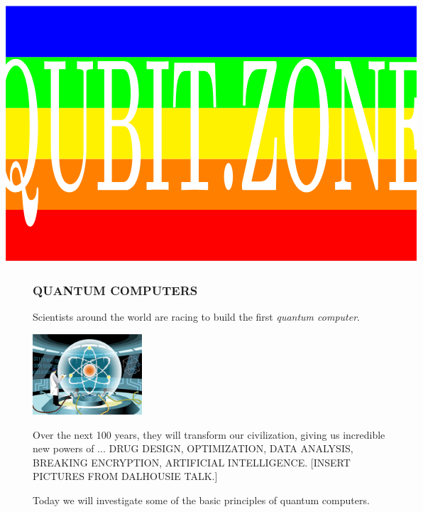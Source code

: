 \documentclass[aspectratio=169]{beamer}
\begin{document}
{
\begin{frame}
\vspace{-20pt}
\[
\hspace{-2cm}
\begin{tikzpicture}[xscale=1.2, yscale=1.8]
\foreach \x/\y in {0/red,1/orange,2/yellow,3/green,4/blue} {
  \path [fill=\y] (0,\x) rectangle +(\textwidth,1);
}
\path [use as bounding box] (current bounding box.south west) rectangle (current bounding box.north east);
\node [scale=2.5, white, yscale=3.04] at (0.5*\textwidth,2.29) {\Huge\bf QUBIT.ZONE};
\end{tikzpicture}
\hspace{-2cm}
\]

\end{frame}
}

\addtocounter{framenumber}{-1}




\begin{frame}
\frametitle{QUANTUM COMPUTERS}

\begin{minipage}{0.5\textwidth}\raggedright
Scientists around the world are racing to build the first \textit{quantum computer}.
\end{minipage}
\begin{minipage}{0.4\textwidth}\raggedright
\includegraphics[height=3cm]{images/quantum_atom_in_room.png}
\end{minipage}

\vspace{15pt}
Over the next 100 years, they will transform our civilization, giving us incredible new powers of ... DRUG DESIGN, OPTIMIZATION, DATA ANALYSIS, BREAKING ENCRYPTION, ARTIFICIAL INTELLIGENCE. [INSERT PICTURES FROM DALHOUSIE TALK.]

\vspace{15pt}
Today we will investigate some of the basic principles of quantum computers.

\end{frame}
\end{document}
